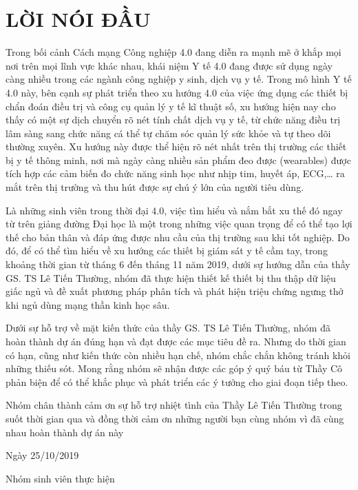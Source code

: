\chapter*{LỜI NÓI ĐẦU}

Trong bối cảnh Cách mạng Công nghiệp 4.0 đang diễn ra mạnh mẽ ở khắp mọi nơi trên mọi lĩnh vực khác nhau, khái niệm Y tế 4.0 đang được sử dụng ngày càng nhiều trong các ngành công nghiệp y sinh, dịch vụ y tế. Trong mô hình Y tế 4.0 này, bên cạnh sự phát triển theo xu hướng 4.0 của việc ứng dụng các thiết bị chẩn đoán điều trị và công cụ quản lý y tế kĩ thuật số, xu hướng hiện nay cho thấy có một sự dịch chuyển rõ nét tính chất dịch vụ y tế, từ chức năng điều trị lâm sàng sang chức năng cá thể tự chăm sóc quản lý sức khỏe và tự theo dõi thường xuyên. Xu hướng này được thể hiện rõ nét nhất trên thị trường các thiết bị y tế thông minh, nơi mà ngày càng nhiều sản phẩm đeo được (wearables) được tích hợp các cảm biến đo chức năng sinh học như nhịp tim, huyết áp, ECG,… ra mắt trên thị trường và thu hút được sự chú ý lớn của người tiêu dùng.


Là những sinh viên trong thời đại 4.0, việc tìm hiểu và nắm bắt xu thế đó ngay từ trên giảng đường Đại học là một trong những việc quan trọng để có thể tạo lợi thế cho bản thân và đáp ứng được nhu cầu của thị trường sau khi tốt nghiệp. Do đó, để có thể tìm hiểu về xu hướng các thiết bị giám sát y tế cầm tay, trong khoảng thời gian từ tháng 6 đến tháng 11 năm 2019, dưới sự hướng dẫn của thầy GS. TS Lê Tiến Thường, nhóm đã thực hiện thiết kế thiết bị thu thập dữ liệu giấc ngủ và đề xuất phương pháp phân tích và phát hiện triệu chứng ngưng thở khi ngủ dùng mạng thần kinh học sâu.

Dưới sự hỗ trợ về mặt kiến thức của thầy GS. TS Lê Tiến Thường, nhóm đã hoàn thành dự án đúng hạn và đạt được các mục tiêu đề ra. Nhưng do thời gian có hạn, cũng như kiến thức còn nhiều hạn chế, nhóm chắc chắn không tránh khỏi những thiếu sót. Mong rằng nhóm sẽ nhận được các góp ý quý báu từ Thầy Cô phản biện để có thể khắc phục và phát triển các ý tưởng cho giai đoạn tiếp theo.

Nhóm chân thành cảm ơn sự hỗ trợ nhiệt tình của Thầy Lê Tiến Thường trong suốt thời gian qua và đồng thời cảm ơn những người bạn cùng nhóm vì đã cùng nhau hoàn thành dự án này

\vspace{1cm}

\tabto{10cm} Ngày 25/10/2019

\vspace{2cm}

\tabto{9.5cm} Nhóm sinh viên thực hiện


\newpage